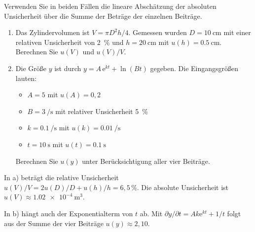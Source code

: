 \begin{ExerciseBlock}
Verwenden Sie in beiden Fällen die lineare Abschätzung der absoluten Unsicherheit über die Summe der Beträge der einzelnen Beiträge.
\begin{enumerate}
\item Das Zylindervolumen ist $V=\pi D^2h/4$. Gemessen wurden $D=\qty{10}{\centi\metre}$ mit einer relativen Unsicherheit von \qty{2}{\percent} und $h=\qty{20}{\centi\metre}$ mit $u(h)=\qty{0.5}{\centi\metre}$. Berechnen Sie $u(V)$ und $u(V)/V$.
\item Die Größe $y$ ist durch $y=A\,\mathrm e^{kt}+\ln(Bt)$ gegeben. Die Eingangsgrößen lauten:
\begin{itemize}
\item $A=5$ mit $u(A)=0{,}2$
\item $B=\qty{3}{\per\second}$ mit relativer Unsicherheit \qty{5}{\percent}
\item $k=\qty{0.1}{\per\second}$ mit $u(k)=\qty{0.01}{\per\second}$
\item $t=\qty{10}{\second}$ mit $u(t)=\qty{0.1}{\second}$
\end{itemize}
Berechnen Sie $u(y)$ unter Berücksichtigung aller vier Beiträge.
\end{enumerate}
\end{ExerciseBlock}
\begin{Solution}
\begin{RemarkBox}[title=Korrektur zur handschriftlichen Lösung]
In a) beträgt die relative Unsicherheit $u(V)/V=2u(D)/D+u(h)/h=6{,}5\,\%$. Die absolute Unsicherheit ist $u(V)\approx\qty{1.02e-4}{\metre\cubed}$.

In b) hängt auch der Exponentialterm von $t$ ab. Mit
$\partial y/\partial t=Ak\mathrm e^{kt}+1/t$ folgt aus der Summe der vier Beiträge $u(y)\approx2{,}10$.
\end{RemarkBox}
\end{Solution}

